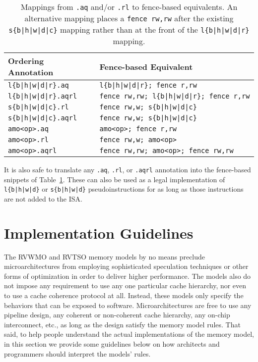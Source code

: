 \begin{table}[h!]
\centering
  \begin{tabular}{|l|l|}
    \hline
    Ordering Annotation & Fence-based Equivalent \\
    \hline
    \tt l\{b|h|w|d|r\}.aq        & \tt l\{b|h|w|d|r\}; fence r,rw \\
    \hline
    \tt l\{b|h|w|d|r\}.aqrl      & \tt fence rw,rw; l\{b|h|w|d|r\}; fence r,rw \\
    \hline
    \tt s\{b|h|w|d|c\}.rl        & \tt fence rw,w; s\{b|h|w|d|c\} \\
    \hline
    \tt s\{b|h|w|d|c\}.aqrl      & \tt fence rw,w; s\{b|h|w|d|c\} \\
    \hline
    \tt amo<op>.aq               & \tt amo<op>; fence r,rw \\
    \hline
    \tt amo<op>.rl               & \tt fence rw,w; amo<op> \\
    \hline
    \tt amo<op>.aqrl             & \tt fence rw,rw; amo<op>; fence rw,rw \\
    \hline
  \end{tabular}
  \caption{Mappings from {\tt .aq} and/or {\tt .rl} to fence-based equivalents.  An alternative mapping places a {\tt fence rw,rw} after the existing {\tt s\{b|h|w|d|c\}} mapping rather than at the front of the {\tt l\{b|h|w|d|r\}} mapping.}
  \label{tab:aqrltofence}
\end{table}

It is also safe to translate any {\tt .aq}, {\tt .rl}, or {\tt .aqrl} annotation into the fence-based snippets of Table~\ref{tab:aqrltofence}.
These can also be used as a legal implementation of {\tt l\{b|h|w|d\}} or {\tt s\{b|h|w|d\}} pseudoinstructions for as long as those instructions are not added to the ISA.

\section{Implementation Guidelines}

The RVWMO and RVTSO memory models by no means preclude microarchitectures from employing sophisticated speculation techniques or other forms of optimization in order to deliver higher performance.
The models also do not impose any requirement to use any one particular cache hierarchy, nor even to use a cache coherence protocol at all.
Instead, these models only specify the behaviors that can be exposed to software.
Microarchitectures are free to use any pipeline design, any coherent or non-coherent cache hierarchy, any on-chip interconnect, etc., as long as the design satisfy the memory model rules.
That said, to help people understand the actual implementations of the memory model, in this section we provide some guidelines below on how architects and programmers should interpret the models' rules.

